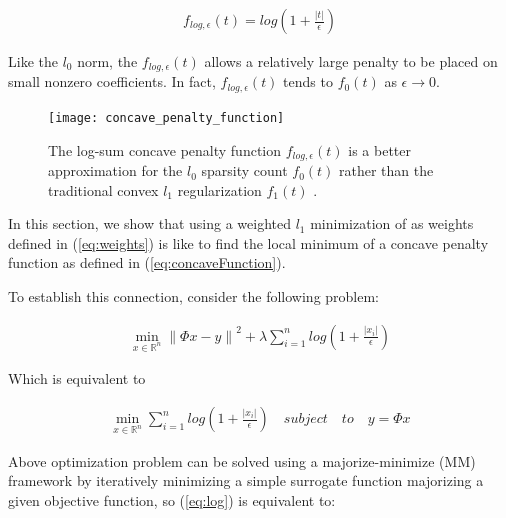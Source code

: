 \begin{equation}
\label{eq:concaveFunction}
\begin{gathered}
f_{log,\epsilon}(t) = log(1+\frac{\left | t \right |}{\epsilon })
\end{gathered}
\end{equation}

Like the $l_0$ norm, the $f_{log,\epsilon}(t)$ allows a relatively large penalty to be placed on small nonzero coefficients. In fact, $f_{log,\epsilon}(t)$ tends to $f_0(t)$ as $\epsilon \rightarrow 0$.

\begin{figure}
\centering
\texttt{[image: concave\_penalty\_function]}\
\centering
\caption{The log-sum concave penalty function $f_{log,\epsilon}(t)$ is a better approximation for the $l_0$ sparsity count $f_0(t)$ rather than the traditional convex $l_1$ regularization $f_1(t)$ \cite{candes2008enhancing}.}
\label{concave_penalty_function}
\end{figure}

In this section, we show that using a weighted $l_{1}$ minimization of as weights defined in (\ref{eq:weights}) is like to find the local minimum of a concave penalty function as defined in (\ref{eq:concaveFunction}). 

To establish this connection, consider the following problem:

\begin{equation}
\begin{gathered}
\min_{x\in \mathbb{R}^{n}}\left\|\Phi x-y\right\|^{2} + \lambda \sum_{i=1}^{n} log(1+\frac{\left | x_{i} \right |}{\epsilon })
\end{gathered}
\end{equation}

Which is equivalent to 

\begin{equation}
\label{eq:log}
\begin{gathered}
\min_{x\in \mathbb{R}^{n}} 
\sum_{i=1}^{n} log(1+\frac{\left | x_{i} \right |}{\epsilon })
\quad subject \quad to \quad y=\Phi x
\end{gathered}
\end{equation}

Above optimization problem can be solved using a majorize-minimize (MM) \cite{hunter2004} framework by iteratively minimizing a simple surrogate function majorizing a given objective function, so (\ref{eq:log}) is equivalent to:

